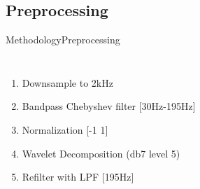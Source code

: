 \documentclass[10pt]{beamer}
\begin{document}
\subsection{Preprocessing}
\begin{frame}{Methodology}{Preprocessing}
\begin{columns}
	\begin{enumerate}
		\item Downsample to 2kHz
		\item Bandpass Chebyshev filter [30Hz-195Hz]
		\item Normalization [-1 1]
		\item Wavelet Decomposition (db7 level 5)
		\item Refilter with LPF [195Hz]
	\end{enumerate}{}
	
\end{columns}
\end{frame}
\end{document}
